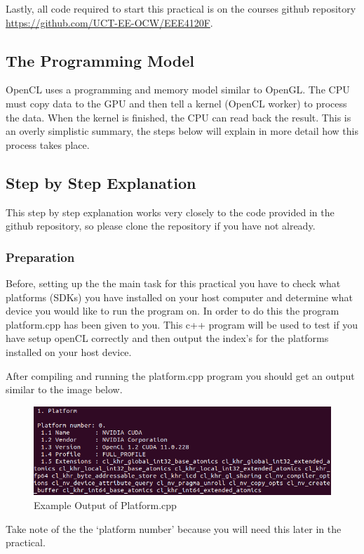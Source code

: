 Lastly, all code required to start this practical is on the courses github repository \href{https://github.com/UCT-EE-OCW/EEE4120F}{https://github.com/UCT-EE-OCW/EEE4120F}.

\subsection{The Programming Model}
OpenCL uses a programming and memory model similar to OpenGL. The CPU must copy data to the GPU and then tell a kernel (OpenCL worker) to process the data. When the kernel is finished, the CPU can read back the result. This is an overly simplistic summary, the steps below will explain in more detail how this process takes place.


\subsection{Step by Step Explanation}
This step by step explanation works very closely to the code provided in the github repository, so please clone the repository if you have not already.

\subsubsection{Preparation}
Before, setting up the the main task for this practical you have to check what platforms (SDKs) you have installed on your host computer and determine what device you would like to run the program on. In order to do this the program platform.cpp has been given to you. This c++ program will be used to test if you have setup openCL correctly and then output the index's for the platforms installed on your host device.

After compiling and running the platform.cpp program you should get an output similar to the image below.

\begin{figure}[H]
\centering
\includegraphics[width=0.6\columnwidth]{Figures/platformOutput.png}
\caption{Example Output of Platform.cpp}
\label{fig:platform}
\end{figure}

Take note of the the `platform number' because you will need this later in the practical.

